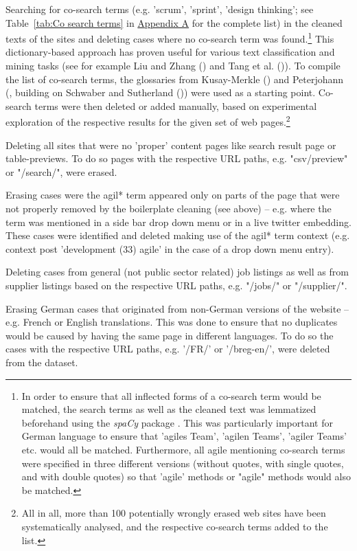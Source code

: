 \begin{compactitem}
\begin{compactitem}
    \item Searching for co-search terms (e.g. 'scrum', 'sprint', 'design thinking'; see Table~\ref{tab:Co search terms} in \href{Appendix A}{Appendix A} for the complete list) in the cleaned texts of the sites and deleting cases where no co-search term was found.\footnote{In order to ensure that all inflected forms of a co-search term would be matched, the search terms as well as the cleaned text was lemmatized beforehand using the \textit{spaCy} package \parencite{honnibal-johnson:2015:EMNLP}. This was particularly important for German language to ensure that 'agiles Team', 'agilen Teams', 'agiler Teams' etc. would all be matched. Furthermore, all agile mentioning co-search terms were specified in three different versions (without quotes, with single quotes, and with double quotes) so that 'agile' methods or "agile" methods would also be matched.} This dictionary-based approach has proven useful for various text classification and mining tasks (see for example Liu and Zhang (\cite*{Liu2012}) and  Tang et al. (\cite*{TANG2013})). To compile the list of co-search terms, the glossaries from Kusay-Merkle (\cite*{Kusay-Merkle2018}) and Peterjohann (\cite*{Peterjohann2020}, building on Schwaber  and  Sutherland (\cite*{Schwaber2020})) were used as a starting point. Co-search terms were then deleted or added manually, based on experimental exploration of the respective results for the given set of web pages.\footnote{All in all, more than 100 potentially wrongly erased web sites have been systematically analysed, and the respective co-search terms added to the list.} 
    \item Deleting all sites that were no 'proper' content pages like search result page or table-previews. To do so pages with the respective URL paths, e.g. "csv/preview" or "/search/", were erased.
    \item Erasing cases were the agil* term appeared only on parts of the page that were not properly removed by the boilerplate cleaning (see above) – e.g. where the term was mentioned in a side bar drop down menu or in a live twitter embedding. These cases were identified and deleted making use of the agil* term context (e.g. context post 'development (33) agile' in the case of a drop down menu entry).
    \item Deleting cases from general (not public sector related) job listings as well as from supplier listings based on the respective URL paths, e.g. "/jobs/" or "/supplier/".
    \end{compactitem}
\item Erasing German cases that originated from non-German versions of the website – e.g. French or English translations. This was done to ensure that no duplicates would be caused by having the same page in different languages. To do so the cases with the respective URL paths, e.g. '/FR/' or '/breg-en/', were deleted from the dataset.

\end{compactitem}
